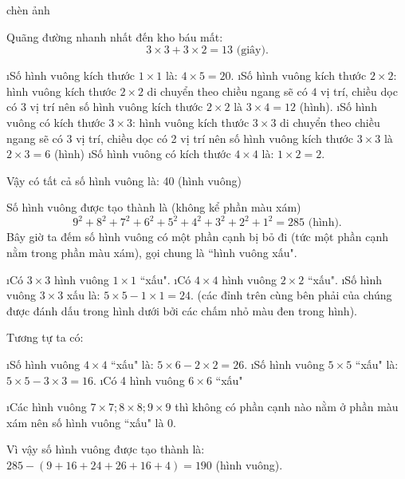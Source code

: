 \begin{Answer}{70}
		chèn ảnh
	
\end{Answer}
\begin{Answer}{71}
		Quãng đường nhanh nhất đến kho báu mất:
		\[3 \times 3 + 3\times 2 = 13 \text{ (giây).}\]
	
\end{Answer}
\begin{Answer}{72}
		\begin{enumerate}[--, leftmargin=*]
			\i Số hình vuông kích thước $1\times 1$  là: $4 \times 5 = 20$.
			\i Số hình vuông kích thước  $2\times 2$: hình vuông kích thước $2\times 2$  di chuyển theo chiều ngang sẽ có $4$ vị trí, chiều dọc có $3$ vị trí nên số hình vuông kích thước $2\times 2$  là $3\times 4 = 12$  (hình).
			\i Số hình vuông có kích thước  $3\times 3$: hình vuông kích thước $3\times 3$  di chuyển theo chiều ngang sẽ có 3 vị trí, chiều dọc có 2 vị trí nên số hình vuông kích thước  $3\times 3$ là $2\times 3 = 6$ (hình)
			\i Số hình vuông có kích thước $4 \times 4$ là: $1\times 2 = 2$.
		\end{enumerate}
		Vậy có tất cả số hình vuông là: 40 (hình vuông)
	
\end{Answer}
\begin{Answer}{73}
		Số hình vuông được tạo thành là (không kể phần màu xám)
		\[{9^2} + {8^2} + {7^2} + {6^2} + {5^2} + {4^2} + {3^2} + {2^2} + {1^2} = 285 \text{ (hình).}\]
		Bây giờ ta đếm số hình vuông có một phần cạnh bị bỏ đi (tức một phần cạnh nằm trong phần màu xám), gọi chung là ``hình vuông xấu".
		\begin{enumerate}[--, leftmargin=*]
			\i Có $3\times3$  hình vuông $1\times 1$  ``xấu".
			\i Có $4\times4$  hình vuông $2\times 2$  ``xấu".
			\i Số hình vuông $3\times 3$  xấu là: $5\times 5 - 1\times 1 = 24$. (các đỉnh trên cùng bên phải của chúng được đánh dấu trong hình dưới bởi các chấm nhỏ màu đen trong hình).
		\end{enumerate}
		Tương tự ta có:
		\begin{enumerate}[--, leftmargin=*]
			\i Số hình vuông $4\times 4$  ``xấu" là: $5 \times 6 - 2 \times 2 = 26$.
			\i Số hình vuông $5 \times 5$  ``xấu" là: $5 \times 5 - 3\times 3 = 16$.
			\i Có 4 hình vuông $6 \times 6$  ``xấu"
			
			\i Các hình vuông $7\times7; 8\times 8; 9\times 9$ thì không có phần cạnh nào nằm ở phần màu xám nên số hình vuông ``xấu" là 0.
		\end{enumerate}
		Vì vậy số hình vuông được tạo thành là: $285 - \left( {9 + 16 + 24 + 26 + 16 + 4} \right) = 190$  (hình vuông).
	
\end{Answer}
